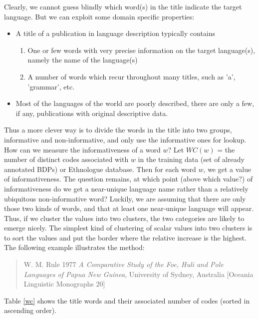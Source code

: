 \documentclass[english,11pt,twoside]{article}
\begin{document}
Clearly, we cannot guess blindly which word(s) in the title indicate
the target language. But we can exploit some domain specific
properties:
\begin{itemize}
\item A title of a publication in language description typically
  contains
\begin{enumerate}
\item One or few words with very precise information on the target
  language(s), namely the name of the language(s)
\item A number of words which recur throughout many titles, such as
  'a', 'grammar', etc.
\end{enumerate}
\item Most of the languages of the world are poorly described, there
  are only a few, if any, publications with original descriptive data.
\end{itemize}
Thus a more clever way is to divide the words in the title into two
groups, informative and non-informative, and only use the informative
ones for lookup. How can we measure the informativeness of a word $w$?
Let $WC(w)$ = the number of distinct codes associated with $w$ in the
training data (set of already annotated BDPs) or Ethnologue database.
Then for each word $w$, we get a value of informativeness. The
question remains, at which point (above which value?) of
informativeness do we get a near-unique language name rather than a
relatively ubiquitous non-informative word? Luckily, we are assuming
that there are only those two kinds of words, and that at least one
near-unique language will appear. Thus, if we cluster the values into
two clusters, the two categories are likely to emerge nicely.  The
simplest kind of clustering of scalar values into two clusters is to
sort the values and put the border where the relative increase is the
highest. The following example illustrates the method:
\begin{quote}
W. M. Rule 1977 \emph{A Comparative Study of the Foe, Huli and Pole Languages of Papua New Guinea}, University of Sydney, Australia [Oceania Linguistic Monographs 20]
\end{quote}

Table \ref{wc} shows the title words and their associated number of
codes (sorted in ascending order).
\end{document}
